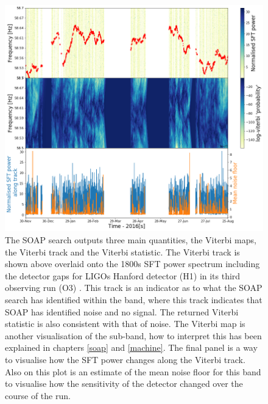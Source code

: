 \begin{figure}[hpt]
	\centering
	\includegraphics[width=\textwidth]{C6_detchar/track_F58_5_58_7_noise.png}
	\caption[Example SOAP output for Gaussian like noise.]{The SOAP search outputs three main
quantities, the Viterbi maps, the Viterbi track and the Viterbi statistic. The
Viterbi track is shown above overlaid onto the 1800s \gls{SFT} power spectrum
including the detector gaps for \glspl{LIGO} Hanford detector (H1) in its
third observing run (O3) \citep{}. This track is an indicator as to what the SOAP search has identified within the band, where this track indicates that SOAP has identified noise and no signal. The returned Viterbi statistic is also consistent with that of noise.
The Viterbi map is another visualisation of the sub-band, how to interpret this
has been explained in chapters \ref{soap} and \ref{machine}. The final panel is a way to visualise how the \gls{SFT}
power changes along the Viterbi track. Also on this plot is an estimate of the
mean noise floor for this band to visualise how the sensitivity of the detector
changed over the course of the run.}

	\label{detchar:soap:noiseplot}
\end{figure}

%

